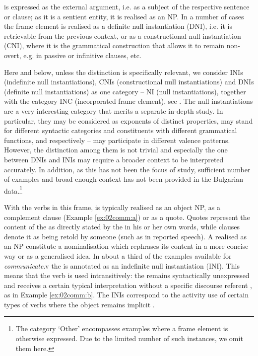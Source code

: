 \documentclass[output=paper,colorlinks,citecolor=brown]{langscibook}
\begin{document}
 is expressed as the external argument, i.e. as a subject of the respective sentence or clause; as it is a sentient entity, it is realised as an NP. In a number of cases the frame element is realised as a definite null instantiation (DNI), i.e. it is retrievable from the previous context, or as a constructional null instantiation (CNI), where it is the grammatical construction that allows it to remain non-overt, e.g. in passive or infinitive clauses, etc.

Here and below, unless the distinction is specifically relevant, we consider INIs (indefinite null instantiations), CNIs (constructional null instantiations) and DNIs (definite null instantiations) as one category -- NI (null instantiations), together with the category INC (incorporated frame element), see \citet{petruck-2019-meaning}. The null instantiations are a very interesting category that merits a separate in-depth study. In particular, they may be considered as exponents of distinct properties, may stand for different syntactic categories and constituents with different grammatical functions, and respectively -- may participate in different valence patterns. However, the distinction among them is not trivial and especially the one between DNIs and INIs may require a broader context to be interpreted accurately. In addition, as this has not been the focus of study, sufficient number of examples and broad enough context has not been provided in the Bulgarian data.\footnote{The category `Other’ encompasses examples where a frame element is otherwise expressed. Due to the limited number of such instances, we omit them here.} 

With the verbs in this frame,  is typically realised as an object NP, as a complement clause (Example \ref{ex:02comm:a}) or as a quote. Quotes represent the content of the  as directly stated by the  in his or her own words, while clauses denote it as being retold by someone (such as in reported speech). A  realised as an NP constitute a nominalisation which rephrases its content in a more concise way or as a generalised idea. In about a third of the examples available for \textit{communicate}.v the  is annotated as an indefinite null instantiation (INI). This means that the verb is used intransitively: the  remains syntactically unexpressed and receives a certain typical interpretation without a specific discourse referent \citep{Ruppenhofer2016}, as in Example \ref{ex:02comm:b}. The INIs correspond to the activity use of certain types of verbs where the object remains implicit \citep{VanValinLaPolla1997}. 
\end{document}

